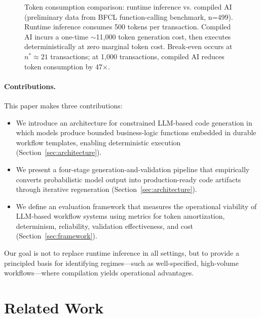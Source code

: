 \documentclass[11pt]{article}
\begin{document}
\begin{figure}[ht]
\begin{tikzpicture}[scale=0.9]
\end{tikzpicture}
\caption{Token consumption comparison: runtime inference vs. compiled AI (preliminary data from BFCL function-calling benchmark, n=499). Runtime inference consumes 500 tokens per transaction. Compiled AI incurs a one-time $\sim$11,000 token generation cost, then executes deterministically at zero marginal token cost. Break-even occurs at $n^*\approx21$ transactions; at 1,000 transactions, compiled AI reduces token consumption by 47$\times$.}
\label{fig:economics}
\end{figure}

\paragraph{Contributions.}
This paper makes three contributions:
\begin{itemize}
    \item We introduce an architecture for constrained LLM-based code generation in which models produce bounded business-logic functions embedded in durable workflow templates, enabling deterministic execution (Section~\ref{sec:architecture}).
    \item We present a four-stage generation-and-validation pipeline that empirically converts probabilistic model output into production-ready code artifacts through iterative regeneration (Section~\ref{sec:architecture}).
    \item We define an evaluation framework that measures the operational viability of LLM-based workflow systems using metrics for token amortization, determinism, reliability, validation effectiveness, and cost (Section~\ref{sec:framework}).
\end{itemize}

Our goal is not to replace runtime inference in all settings, but to provide a principled basis for identifying regimes—such as well-specified, high-volume workflows—where compilation yields operational advantages.

\section{Related Work}
\label{sec:related-work}
\end{document}
